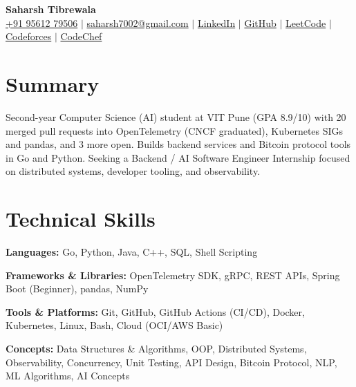 \documentclass[letterpaper,10.5pt]{article}
\begin{document}
\setlength{\parskip}{0pt}

\begin{center}
 {\LARGE \textbf{Saharsh Tibrewala}} \\[1pt]
 \footnotesize
 \href{tel:+919561279506}{+91 95612 79506} $\mid$
 \href{mailto:saharsh7002@gmail.com}{saharsh7002@gmail.com} $\mid$
 \href{https://linkedin.com/in/saharsh-tibrewala}{LinkedIn} $\mid$
 \href{https://github.com/itssaharsh}{GitHub} $\mid$
 \href{https://leetcode.com/u/itssaharsh}{LeetCode} $\mid$
 \href{https://codeforces.com/profile/itssah}{Codeforces} $\mid$
 \href{https://www.codechef.com/users/itssaharsh}{CodeChef}
\end{center}
\vspace{-6pt}

\section{Summary}
Second-year Computer Science (AI) student at VIT Pune (GPA 8.9/10) with 20 merged pull requests into OpenTelemetry (CNCF graduated), Kubernetes SIGs and pandas, and 3 more open. Builds backend services and Bitcoin protocol tools in Go and Python. Seeking a Backend / AI Software Engineer Internship focused on distributed systems, developer tooling, and observability.

\section{Technical Skills}
\begin{itemize}[leftmargin=0pt, label={}]
  \small{
    \item \textbf{Languages:} Go, Python, Java, C++, SQL, Shell Scripting
    \item \textbf{Frameworks \& Libraries:} OpenTelemetry SDK, gRPC, REST APIs, Spring Boot (Beginner), pandas, NumPy
    \item \textbf{Tools \& Platforms:} Git, GitHub, GitHub Actions (CI/CD), Docker, Kubernetes, Linux, Bash, Cloud (OCI/AWS Basic)
    \item \textbf{Concepts:} Data Structures \& Algorithms, OOP, Distributed Systems, Observability, Concurrency, Unit Testing, API Design, Bitcoin Protocol, NLP, ML Algorithms, AI Concepts
  }
\end{itemize}

\end{document}
